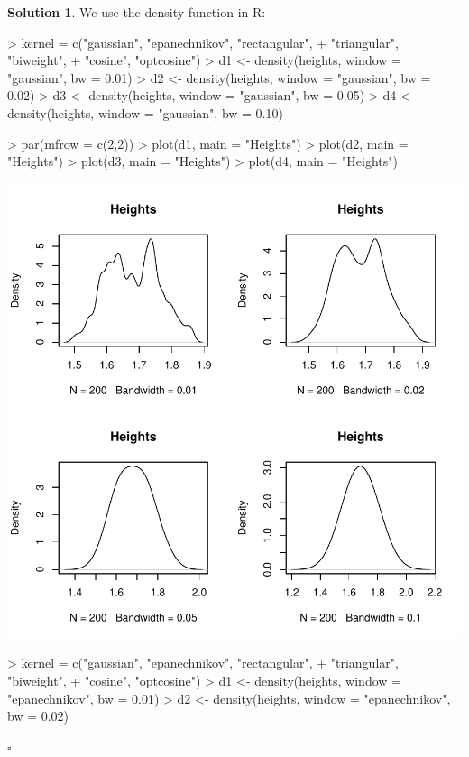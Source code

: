 \documentclass[twoside]{article}
\theoremstyle{definition}
\newtheorem*{solutionT}{Solution}
\newenvironment{solution}{\begin{cBox}\begin{solutionT}}{\hfill{\scriptsize\ensuremath{\square}}\end{solutionT}\end{cBox}}
\theoremstyle{definition}
\begin{document}
\begin{enumerate}
\begin{solution}
We use the density function in R:
\begin{Schunk}
\begin{Sinput}
> kernel = c("gaussian", "epanechnikov", "rectangular",
+                    "triangular", "biweight",
+                    "cosine", "optcosine")
> d1 <- density(heights, window = "gaussian", bw = 0.01)
> d2 <- density(heights, window = "gaussian", bw = 0.02)
> d3 <- density(heights, window = "gaussian", bw = 0.05)
> d4 <- density(heights, window = "gaussian", bw = 0.10)
\end{Sinput}
\end{Schunk}
\begin{Schunk}
\begin{Sinput}
> par(mfrow = c(2,2))
> plot(d1, main = "Heights")
> plot(d2, main = "Heights")
> plot(d3, main = "Heights")
> plot(d4, main = "Heights")
\end{Sinput}
\end{Schunk}
\includegraphics{week3-003}
\begin{Schunk}
\begin{Sinput}
> kernel = c("gaussian", "epanechnikov", "rectangular",
+                    "triangular", "biweight",
+                    "cosine", "optcosine")
> d1 <- density(heights, window = "epanechnikov", bw = 0.01)
> d2 <- density(heights, window = "epanechnikov", bw = 0.02)

\end{Sinput}
\end{Schunk}
\end{solution}
\end{enumerate}
\end{document}

